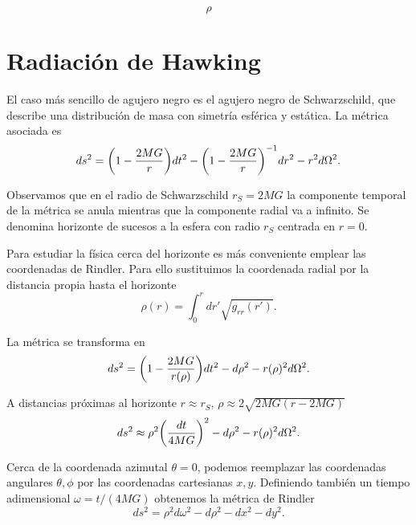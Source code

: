 \begin{equation}
  \rho 
\end{equation}

\section{Radiación de Hawking}










El caso más sencillo de agujero negro es el agujero negro de Schwarzschild, que
describe una distribución de masa con simetría esférica y estática. La métrica asociada
es 
\begin{equation}
  ds^2= \qty(1-\frac{2MG}{r})dt^2-\qty(1-\frac{2MG}{r})^{-1}dr^2-r^2d\Omega^2.
\end{equation}

Observamos que en el radio de Schwarzschild $r_S=2MG$ la componente temporal de la 
métrica se anula mientras que la componente radial va a infinito.
Se denomina horizonte de sucesos a la esfera con radio $r_S$ centrada en $r=0$.

Para estudiar la física cerca del horizonte es más conveniente emplear las coordenadas
de Rindler. Para ello sustituimos la coordenada radial por la distancia propia hasta
el horizonte
\begin{equation}
  \rho(r)=\int_0^r dr' \sqrt{g_{rr}(r')}.
\end{equation}

La métrica se transforma en 
\begin{equation}
  ds^2=\qty(1-\frac{2MG}{r(\rho)})dt^2-d\rho^2-r(\rho)^2d\Omega^2.
\end{equation}

A distancias próximas al horizonte $r\approx r_S$, $\rho\approx 2\sqrt{2MG(r-2MG)}$
\begin{equation}
  ds^2\approx \rho^2\qty(\frac{dt}{4MG})^2 -d\rho^2-r(\rho)^2d\Omega^2.
\end{equation}

Cerca de la coordenada azimutal $\theta=0$, podemos reemplazar las coordenadas
angulares $\theta,\phi$ por las coordenadas cartesianas $x,y$. Definiendo
también un tiempo adimensional $\omega=t/(4MG)$ obtenemos la métrica de Rindler
\begin{equation}
  ds^2=\rho^2d\omega^2 -d\rho^2 -dx^2-dy^2.
\end{equation}

